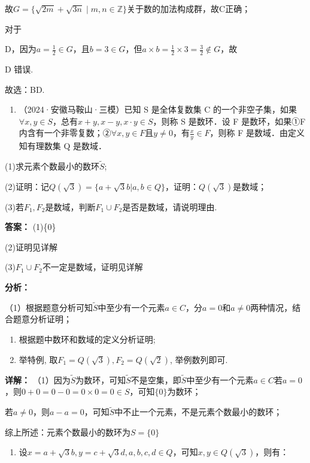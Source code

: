 \documentclass[11pt,a4paper]{ctexart}
\begin{document}
故\(G=\{\sqrt{2m}+\sqrt{3n}\mid m,n\in\mathbb{Z}\}\)关于数的加法构成群，故C正确；

对于

D，因为\(a = \frac{1}{2} \in G\)，且\(b = 3 \in G\)，但\(a \times b = \frac{1}{2} \times 3 = \frac{3}{2} \notin G\)，故

D 错误.

故选：BD.

\begin{enumerate}[label=\arabic*., leftmargin=*, start=6]
\item （2024·安徽马鞍山·三模）已知 S 是全体复数集 C
  的一个非空子集，如果\(\forall x, y \in S\)，总有\(x + y, x - y, x \cdot y \in S\)，则称
  S 是数环．设 F 是数环，如果①F
  内含有一个非零复数；②\(\forall x, y \in F\)且\(y \neq 0\)，有\(\frac{x}{y} \in F\)，则称
  F 是数域．由定义知有理数集 Q 是数域．
\end{enumerate}

(1)求元素个数最小的数环\(\tilde{S}\);

(2)证明：记\(Q(\sqrt{3})=\{a+\sqrt{3}b|a,b\in Q\}\)，证明：\(Q(\sqrt{3})\)是数域；

(3)若\(F_{1},F_{2}\)是数域，判断\(F_{1}\cup F_{2}\)是否是数域，请说明理由.

\textbf{答案：}
(1)\{0\}

(2)证明见详解

(3)\(F_{1} \cup F_{2}\)不一定是数域，证明见详解

\textbf{分析：}

（1）根据题意分析可知\(\tilde{S}\)中至少有一个元素\(a \in C\)，分\(a = 0\)和\(a \neq 0\)两种情况，结合题意分析证明；

\begin{enumerate}[label=\arabic*., leftmargin=*, start=2]
\item 根据题中数环和数域的定义分析证明;
\item
  举特例, 取\(F_{1} = Q(\sqrt{3}), F_{2} = Q(\sqrt{2})\), 举例数列即可.
\end{enumerate}

\textbf{详解：}
（1）因为\(\tilde{S}\)为数环，可知\(\tilde{S}\)不是空集，即\(\tilde{S}\)中至少有一个元素\(a \in C\)若\(a = 0\)，则\(0 + 0 = 0 - 0 = 0 \times 0 = 0 \in S\)，可知\(\{0\}\)为数环；

若\(a \neq 0\)，则\(a - a = 0\)，可知\(\tilde{S}\)中不止一个元素，不是元素个数最小的数环；

综上所述：元素个数最小的数环为\(S = \{0\}\)

\begin{enumerate}[label=\arabic*., leftmargin=*, start=2]
\item 设\(x = a + \sqrt{3} b, y = c + \sqrt{3} d, a, b, c, d \in Q\)，可知\(x, y \in Q(\sqrt{3})\)，则有：
\end{enumerate}
\end{document}

